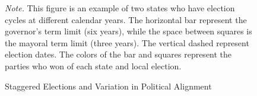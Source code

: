 \documentclass[dv_diss_main.tex]{subfiles}
\begin{document}
\begin{figure}[h]
\begin{center}
\caption{Staggered Elections and Variation in Political Alignment}\label{fig:staggered}
    \end{center}
\vspace{0.5em}
\begin{figurenotes}
    \footnotesize

	\textit{Note. }This figure is an example of two states who have election cycles at different calendar years. The horizontal bar represent the governor's term limit (six years), while the space between squares is the mayoral term limit (three years). The vertical dashed represent election dates. The colors of the bar and squares represent the parties who won of each state and local election.
	\end{figurenotes}
\end{figure}
\end{document}
